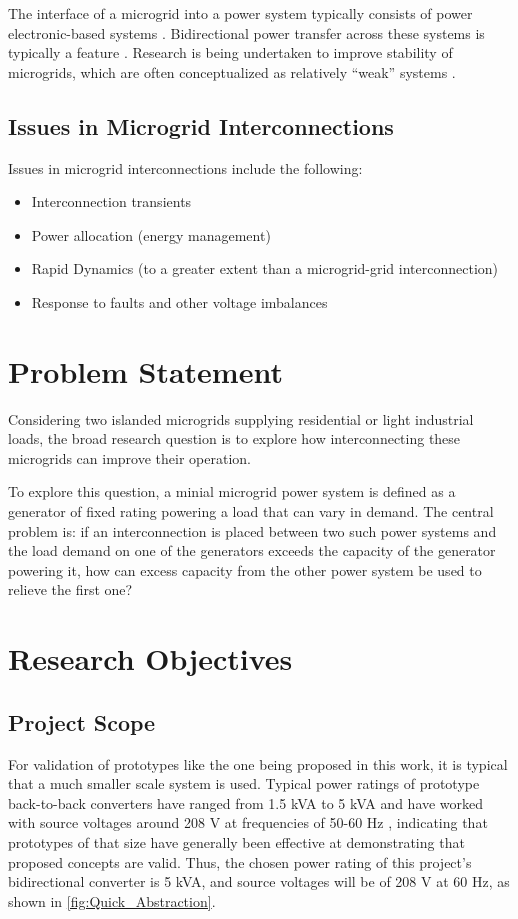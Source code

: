 The interface of a microgrid into a power system typically consists of power electronic-based systems \cite{Barnes}. Bidirectional power transfer across these systems is typically a feature \cite{Deng}. Research is being undertaken to improve stability of microgrids, which are often conceptualized as relatively “weak” systems \cite{Rezaee}.

\subsection{Issues in Microgrid Interconnections}
Issues in microgrid interconnections include the following:
\begin{itemize}
    \item Interconnection transients
    \item Power allocation (energy management)
    \item Rapid Dynamics (to a greater extent than a microgrid-grid interconnection)
    \item Response to faults and other voltage imbalances 
\end{itemize}

\section{Problem Statement}

Considering two islanded microgrids supplying residential or light industrial loads, the broad research question is to explore how interconnecting these microgrids can improve their operation.

To explore this question, a minial microgrid power system is defined as a generator of fixed rating powering a load that can vary in demand. The central problem is: if an interconnection is placed between two such power systems and the load demand on one of the generators exceeds the capacity of the generator powering it, how can excess capacity from the other power system be used to relieve the first one?

\section{Research Objectives}

\subsection{Project Scope}

For validation of prototypes like the one being proposed in this work, it is typical that a much smaller scale system is used. Typical power ratings of prototype back-to-back converters have ranged from 1.5 kVA to 5 kVA \cite{Wu_Model_Size, Jung_Model_Size} and have worked with source voltages around 208 V at frequencies of 50-60 Hz \cite{Blaabjerg_Grid_Synchronization, Wu_Model_Size, Jung_Model_Size}, indicating that prototypes of that size have generally been effective at demonstrating that proposed concepts are valid. Thus, the chosen power rating of this project’s bidirectional converter is 5 kVA, and source voltages will be of 208 V at 60 Hz, as shown in \autoref{fig:Quick_Abstraction}. 

